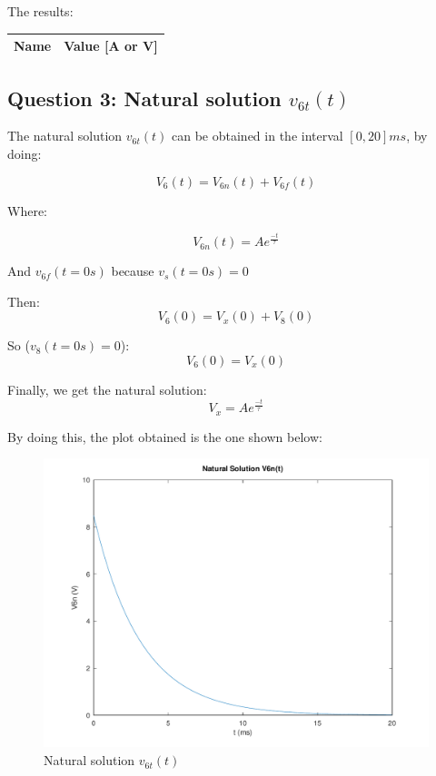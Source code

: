 The results:

\begin{center}
  \begin{tabular}{ | c | c | }
    \hline    
    {\bf Name} & {\bf Value [A or V]} \\ \hline
    
    \hline
  \end{tabular}
\end{center}


\subsection{Question 3: Natural solution $v_{6t}(t)$}
The natural solution $v_{6t}(t)$ can be obtained in the interval $[0,20]ms$, by doing: \par
\begin{equation}
     V_6(t) = V_{6n}(t) + V_{6f}(t)
\end{equation}\par
Where:\par
\begin{equation}
     V_{6n}(t) = {A}e^{\frac{-t}{\tau}}
\end{equation}\par
And $v_{6f}(t=0s)$ because $v_s(t=0s)=0$\par
Then:
\begin{equation}
     V_6(0) = V_x(0) + V_8(0)
\end{equation}\par
So ($v_8(t=0s)=0$):
\begin{equation}
     V_6(0) = V_x(0) 
\end{equation}\par
Finally, we get the natural solution:
\begin{equation}
     V_x =  {A}e^{\frac{-t}{\tau}}
\end{equation}\par

By doing this, the plot obtained is the one shown below:

\begin{figure}[H] \centering
\includegraphics[width=0.7\linewidth]{../mat/alinea3.pdf}
\caption{Natural solution $v_{6t}(t)$}
\label{fig:plot3}
\end{figure}


